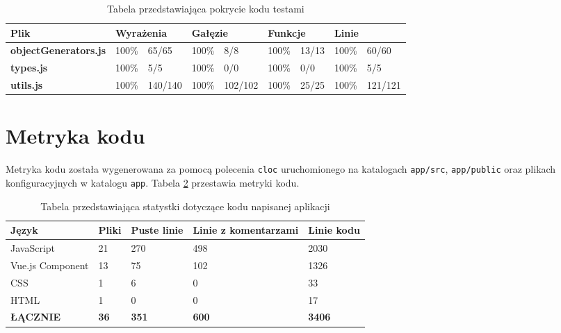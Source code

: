 \documentclass[shortabstract]{iithesis}
\theoremstyle{definition} \newtheorem{definition}{Definicja}[]
\theoremstyle{remark} \newtheorem{remark}[definition]{Observation}
\theoremstyle{plain} \newtheorem{theorem}[definition]{Theorem}
\theoremstyle{plain} \newtheorem{lemma}[definition]{Lemma}
\begin{document}
\begin{table}[h]
    \begin{tabular}{|l|ll|ll|ll|ll|}
    \hline
    \textbf{Plik}                & \multicolumn{2}{l|}{\textbf{Wyrażenia}} & \multicolumn{2}{l|}{\textbf{Gałęzie}} & \multicolumn{2}{l|}{\textbf{Funkcje}} & \multicolumn{2}{l|}{\textbf{Linie}}  \\ \hline
    \textbf{objectGenerators.js} & \multicolumn{1}{l|}{100\%}   & 65/65    & \multicolumn{1}{l|}{100\%}  & 8/8     & \multicolumn{1}{l|}{100\%}   & 13/13  & \multicolumn{1}{l|}{100\%} & 60/60   \\ \hline
    \textbf{types.js}            & \multicolumn{1}{l|}{100\%}   & 5/5      & \multicolumn{1}{l|}{100\%}  & 0/0     & \multicolumn{1}{l|}{100\%}   & 0/0    & \multicolumn{1}{l|}{100\%} & 5/5     \\ \hline
    \textbf{utils.js}            & \multicolumn{1}{l|}{100\%}   & 140/140  & \multicolumn{1}{l|}{100\%}  & 102/102 & \multicolumn{1}{l|}{100\%}   & 25/25  & \multicolumn{1}{l|}{100\%} & 121/121 \\ \hline
    \end{tabular}
    \caption{\label{tab:tests-coverage}Tabela przedstawiająca pokrycie kodu testami}
\end{table}

\section{Metryka kodu}
Metryka kodu została wygenerowana za pomocą polecenia \texttt{cloc} uruchomionego na katalogach \texttt{app/src}, \texttt{app/public} oraz plikach konfiguracyjnych w katalogu \texttt{app}. Tabela \ref{tab:code-lines} przestawia metryki kodu.

\begin{table}[H]
    \begin{tabular}{|l|l|l|l|l|}
    \hline
    \textbf{Język}   & \textbf{Pliki} & \textbf{Puste linie} & \textbf{Linie z komentarzami} & \textbf{Linie kodu} \\ \hline
    JavaScript       & 21             & 270                  & 498                           & 2030                \\ \hline
    Vue.js Component & 13             & 75                   & 102                           & 1326                \\ \hline
    CSS              & 1              & 6                    & 0                             & 33                  \\ \hline
    HTML             & 1              & 0                    & 0                             & 17                  \\ \hline
    \textbf{ŁĄCZNIE} & \textbf{36}    & \textbf{351}         & \textbf{600}                  & \textbf{3406}       \\ \hline
    \end{tabular}
    \caption{\label{tab:code-lines}Tabela przedstawiająca statystki dotyczące kodu napisanej aplikacji}
\end{table}
\end{document}
